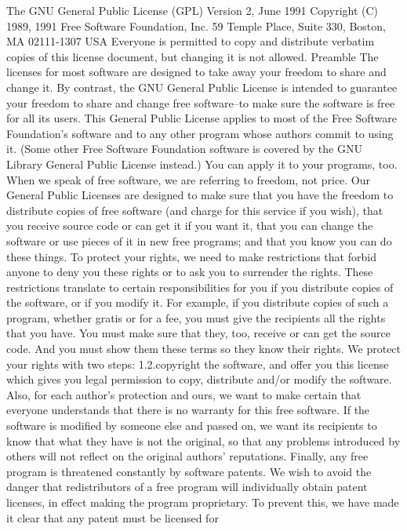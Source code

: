 \documentclass[12pt]{article}
\begin{document}
The GNU General Public License (GPL)
Version 2, June 1991
Copyright (C) 1989, 1991 Free Software Foundation, Inc.
59 Temple Place, Suite 330, Boston, MA 02111-1307 USA
Everyone is permitted to copy and distribute verbatim copies of this license document, but changing
it is not allowed.
Preamble
The licenses for most software are designed to take away your freedom to share and change it. By
contrast, the GNU General Public License is intended to guarantee your freedom to share and
change free software--to make sure the software is free for all its users. This General Public
License applies to most of the Free Software Foundation's software and to any other program
whose authors commit to using it. (Some other Free Software Foundation software is covered by
the GNU Library General Public License instead.) You can apply it to your programs, too.
When we speak of free software, we are referring to freedom, not price. Our General Public
Licenses are designed to make sure that you have the freedom to distribute copies of free software
(and charge for this service if you wish), that you receive source code or can get it if you want it,
that you can change the software or use pieces of it in new free programs; and that you know you
can do these things.
To protect your rights, we need to make restrictions that forbid anyone to deny you these rights or to
ask you to surrender the rights. These restrictions translate to certain responsibilities for you if you
distribute copies of the software, or if you modify it.
For example, if you distribute copies of such a program, whether gratis or for a fee, you must give
the recipients all the rights that you have. You must make sure that they, too, receive or can get the
source code. And you must show them these terms so they know their rights.
We protect your rights with two steps:
1.2.copyright the software, and
offer you this license which gives you legal permission to copy, distribute and/or modify the
software.
Also, for each author's protection and ours, we want to make certain that everyone understands that
there is no warranty for this free software. If the software is modified by someone else and passed
on, we want its recipients to know that what they have is not the original, so that any problems
introduced by others will not reflect on the original authors' reputations.
Finally, any free program is threatened constantly by software patents. We wish to avoid the danger
that redistributors of a free program will individually obtain patent licenses, in effect making the
program proprietary. To prevent this, we have made it clear that any patent must be licensed for
\end{document}

